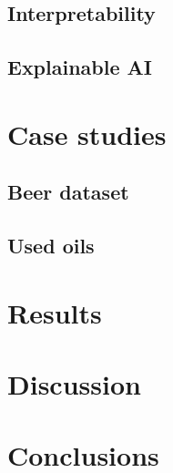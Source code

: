 \documentclass{article}
\begin{document}
	\subsection{Interpretability}
	
	\subsection{Explainable AI}
	
	\section{Case studies}
	
	\subsection{Beer dataset}
	
	\subsection{Used oils}
	
	
	\section{Results}
	
	\section{Discussion}
	
	
	\section{Conclusions}
	
\end{document}

